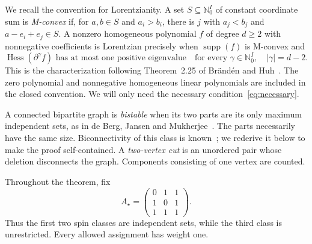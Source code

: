 \documentclass[11pt]{article}
\DeclareMathOperator{\Hess}{Hess}
\DeclareMathOperator{\supp}{supp}
\newcommand{\N}{\mathbb{N}_0}
\begin{document}
We recall the convention for Lorentzianity. A set $S\subseteq\N^I$ of
constant coordinate sum is \emph{M-convex} if, for $a,b\in S$ and
$a_i>b_i$, there is $j$ with $a_j<b_j$ and $a-e_i+e_j\in S$.
A nonzero homogeneous polynomial $f$ of degree $d\ge2$ with nonnegative
coefficients is Lorentzian precisely when $\supp(f)$ is M-convex and
\begin{equation}\label{eq:necessary}
 \Hess(\partial^\gamma f)\text{ has at most one positive eigenvalue}
 \quad\text{for every }\gamma\in\N^I,\quad |\gamma|=d-2.
\end{equation}
This is the characterization following Theorem~2.25 of
Br\"and\'en and Huh~\cite{BH}. The zero polynomial and nonnegative
homogeneous linear polynomials are included in the closed convention.
We will only need the necessary condition~\eqref{eq:necessary}.

A connected bipartite graph is \emph{bistable} when its two parts are its
only maximum independent sets, as in de Berg, Jansen and
Mukherjee~\cite{BJM}. The parts necessarily have the same size. Biconnectivity
of this class is known~\cite{BJM}; we rederive it below to make the proof
self-contained. A \emph{two-vertex cut} is an unordered pair whose deletion
disconnects the graph. Components consisting of one vertex are counted.

Throughout the theorem, fix
\begin{equation}\label{eq:target}
 A_\star=\begin{pmatrix}0&1&1\\1&0&1\\1&1&1\end{pmatrix}.
\end{equation}
Thus the first two spin classes are independent sets, while the third
class is unrestricted. Every allowed assignment has weight one.
\end{document}
